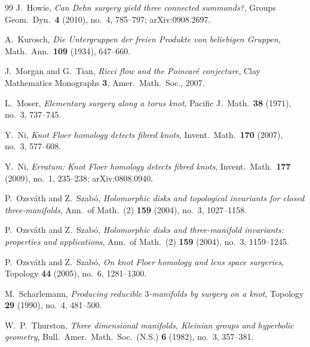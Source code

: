 \documentclass[11pt]{article}
\theoremstyle{definition}
\theoremstyle{remark}
\begin{document}
\begin{thebibliography}{99}
J.~Howie,
\emph{Can Dehn surgery yield three connected summands?},
Groups Geom.\ Dyn.\ \textbf{4} (2010), no.~4, 785--797; arXiv:0908.2697.

A.~Kurosch,
\emph{Die Untergruppen der freien Produkte von beliebigen Gruppen},
Math.\ Ann.\ \textbf{109} (1934), 647--660.

J.~Morgan and G.~Tian,
\emph{Ricci flow and the Poincar\'e conjecture},
Clay Mathematics Monographs \textbf{3}, Amer.\ Math.\ Soc., 2007.

L.~Moser,
\emph{Elementary surgery along a torus knot},
Pacific J.\ Math.\ \textbf{38} (1971), no.~3, 737--745.

Y.~Ni,
\emph{Knot Floer homology detects fibred knots},
Invent.\ Math.\ \textbf{170} (2007), no.~3, 577--608.

Y.~Ni,
\emph{Erratum: Knot Floer homology detects fibred knots},
Invent.\ Math.\ \textbf{177} (2009), no.~1, 235--238; arXiv:0808.0940.

P.~Ozsv\'ath and Z.~Szab\'o,
\emph{Holomorphic disks and topological invariants for closed
three-manifolds},
Ann.\ of Math.\ (2) \textbf{159} (2004), no.~3, 1027--1158.

P.~Ozsv\'ath and Z.~Szab\'o,
\emph{Holomorphic disks and three-manifold invariants: properties and
applications},
Ann.\ of Math.\ (2) \textbf{159} (2004), no.~3, 1159--1245.

P.~Ozsv\'ath and Z.~Szab\'o,
\emph{On knot Floer homology and lens space surgeries},
Topology \textbf{44} (2005), no.~6, 1281--1300.

M.~Scharlemann,
\emph{Producing reducible \(3\)-manifolds by surgery on a knot},
Topology \textbf{29} (1990), no.~4, 481--500.

W.~P.~Thurston,
\emph{Three dimensional manifolds, Kleinian groups and hyperbolic
geometry},
Bull.\ Amer.\ Math.\ Soc.\ (N.S.) \textbf{6} (1982), no.~3, 357--381.

\end{thebibliography}
\end{document}
